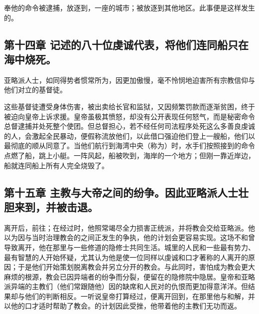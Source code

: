 奉他的命令被逮捕，放逐到，一座的城市；被放逐到其他地区。此事便是这样发生的。\par


\subsection{第十四章 记述的八十位虔诚代表，将他们连同船只在海中烧死。}

亚略派人士，如同得势者惯常所为，因更加傲慢，毫不怜悯地迫害所有宗教信仰与他们对立的基督徒。\par

这些基督徒遭受身体伤害，被出卖给长官和监狱，又因频繁罚款而逐渐贫困，终于被迫向皇帝上诉求援。皇帝虽极其愤怒，却没有公开表现任何怒气，而是秘密命令总督逮捕并处死整个使团。但总督担心，若不经任何司法程序处死这么多善良虔诚的人，会激起全民暴动，便假称流放他们，以此借口强迫他们登上一艘船，他们以最彻底的顺从同意了。当他们航行到海湾中央（称为）时，水手们按照接到的命令点燃了船，跳上小艇。一阵风起，船被吹到，海岸的一个地方；但刚一靠近岸边，船就连同船上所有人完全烧毁了。\par


\subsection{第十五章 主教与大帝之间的纷争。因此亚略派人士壮胆来到，并被击退。}

离开后，前往；在经过时，他照常竭尽全力损害正统派，并将教会交给亚略派。他以为因与当时治理教会的之间正发生的争执，他的计划会更容易实现。这场不和曾导致离开，他在那里与一些修道的隐修士共同生活。城里的人民和一些最有势力、最有智慧的人开始怀疑，尤其认为他是使一位同样以虔诚和口才著称的人离开的原因；于是他们开始策划脱离教会并另立分开的教会。与此同时，害怕成为教会更大麻烦的根源，教会已因异端者的纷争而分裂，便留在的隐修院中隐居。皇帝和亚略派异端的主教们（他们常跟随他）因的缺席和人民对的仇恨而更加得意洋洋。但结果却与他们的判断相反。一听说皇帝打算经过，便离开回到，在那里他与和解，并以他的口才适时帮助了教会。的计划因此受挫，他带着他的主教们无功而返。\par

